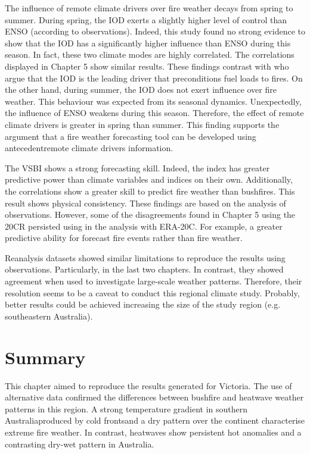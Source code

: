 The influence of remote climate drivers over fire weather decays from
spring to summer. During spring, the IOD exerts a slightly higher
level of control than ENSO (according to observations). Indeed, this
study found no strong evidence to show that the IOD has a significantly
higher influence than ENSO during this season. In fact, these two
climate modes are highly correlated. The correlations displayed in
Chapter 5 show similar results. These findings contrast with \citet{Cai2009}
who argue that the IOD is the leading driver that preconditions fuel
loads to fires. On the other hand, during summer, the IOD does not
exert influence over fire weather. This behaviour was expected from
its seasonal dynamics. Unexpectedly, the influence of ENSO weakens
during this season. Therefore, the effect of remote climate drivers
is greater in spring than summer. This finding supports the argument
that a fire weather forecasting tool can be developed using \textemdash antecedent\textemdash remote
climate drivers information. 

The VSBI shows a strong forecasting skill. Indeed, the index has greater
predictive power than climate variables and indices on their own.
Additionally, the correlations show a greater skill to predict fire
weather than bushfires. This result shows physical consistency. These
findings are based on the analysis of observations. However, some
of the disagreements found in Chapter 5 using the 20CR persisted using
in the analysis with ERA-20C. For example, a greater predictive ability
for forecast fire events rather than fire weather. 

Reanalysis datasets showed similar limitations to reproduce the results
using observations. Particularly, in the last two chapters. In contrast,
they showed agreement when used to investigate large-scale weather
patterns. Therefore, their resolution seems to be a caveat to conduct
this regional climate study. Probably, better results could be achieved
increasing the size of the study region (e.g. southeastern Australia).


\section{Summary}

This chapter aimed to reproduce the results generated for Victoria.
The use of alternative data confirmed the differences between bushfire
and heatwave weather patterns in this region. A strong temperature
gradient in southern Australia\textemdash produced by cold fronts\textemdash and
a dry pattern over the continent characterise extreme fire weather.
In contrast, heatwaves show persistent hot anomalies and a contrasting
dry-wet pattern in Australia. 

